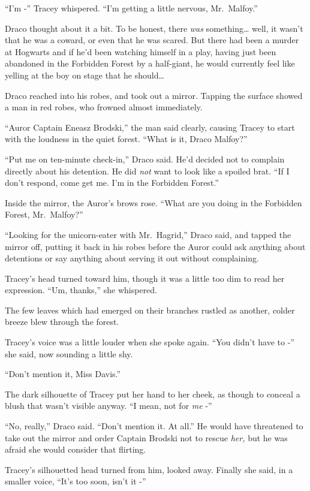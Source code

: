 ``I'm -'' Tracey whispered. ``I'm getting a little nervous,
Mr.~Malfoy.''

Draco thought about it a bit. To be honest, there \emph{was}
something\ldots{} well, it wasn't that he was a coward, or even that he
was scared. But there had been a murder at Hogwarts and if he'd been
watching himself in a play, having just been abandoned in the Forbidden
Forest by a half-giant, he would currently feel like yelling at the boy
on stage that he should\ldots{}

Draco reached into his robes, and took out a mirror. Tapping the surface
showed a man in red robes, who frowned almost immediately.

``Auror Captain Eneasz Brodski,'' the man said clearly, causing Tracey
to start with the loudness in the quiet forest. ``What is it, Draco
Malfoy?''

``Put me on ten-minute check-in,'' Draco said. He'd decided not to
complain directly about his detention. He did \emph{not} want to look
like a spoiled brat. ``If I don't respond, come get me. I'm in the
Forbidden Forest.''

Inside the mirror, the Auror's brows rose. ``What are you doing in the
Forbidden Forest, Mr.~Malfoy?''

``Looking for the unicorn-eater with Mr.~Hagrid,'' Draco said, and
tapped the mirror off, putting it back in his robes before the Auror
could ask anything about detentions or say anything about serving it out
without complaining.

Tracey's head turned toward him, though it was a little too dim to read
her expression. ``Um, thanks,'' she whispered.

The few leaves which had emerged on their branches rustled as another,
colder breeze blew through the forest.

Tracey's voice was a little louder when she spoke again. ``You didn't
have to -'' she said, now sounding a little shy.

``Don't mention it, Miss Davis.''

The dark silhouette of Tracey put her hand to her cheek, as though to
conceal a blush that wasn't visible anyway. ``I mean, not for \emph{me}
-''

``No, really,'' Draco said. ``Don't mention it. At all.'' He would have
threatened to take out the mirror and order Captain Brodski not to
rescue \emph{her,} but he was afraid she would consider that flirting.

Tracey's silhouetted head turned from him, looked away. Finally she
said, in a smaller voice, ``It's too soon, isn't it -''


